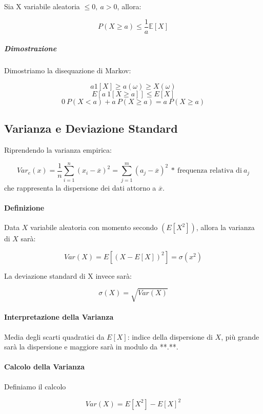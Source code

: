 \documentclass{article}
\begin{document}
\vspace*{5px}

Sia X variabile aleatoria $\leq 0,\: a > 0$, allora:

\[ P(X \geq a) \leq \frac{1}{a} \mathbb{E}[X] \]

\subparagraph{Dimostrazione} Dimostriamo la disequazione di Markov:


\[ a 1[X] \geq a(\omega) \geq X(\omega) \]
\[ E[a\:1[X \geq a]] \leq E[X] \]
\[ 0 \: P(X < a) + a \: P(X \geq a ) = a \: P(X \geq a) \]

\newpage

\subsection{Varianza e Deviazione Standard}

Riprendendo la varianza empirica:

\[ Var_{e}(x) = \frac{1}{n}\sum_{i=1}^{n} (x_{i} - \overline{x})^{2} = \sum_{j=1}^{m} (a_{j} - \overline{x})^{2} \: * \: \text{frequenza relativa di} \: a_{j}   \]
che rappresenta la dispersione dei dati attorno a $\overline{x}$.

\paragraph{Definizione} Data $X$ variabile aleatoria con momento secondo $(E[X^{2}]  )$, allora la varianza di $X$ sarà:

\[ Var(X) = E[(X- E[X])^{2}] = \sigma(x^{2})\]

La deviazione standard di X invece sarà:

\[ \sigma(X) = \sqrt{Var(X)} \]

\paragraph{Interpretazione della Varianza}

Media degli scarti quadratici da $E[X]$: indice della dispersione di $X$, più grande sarà la dispersione e maggiore sarà in modulo da **.**.

\paragraph{Calcolo della Varianza} Definiamo il calcolo 

\[ Var(X) = E[X^{2}] - E[X]^{2} \]
\end{document}
